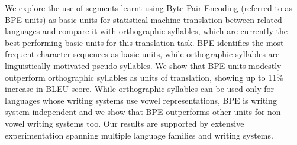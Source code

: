 We explore the use of segments learnt using Byte Pair Encoding (referred to as BPE units) as basic units for statistical machine translation between related languages and compare it with orthographic syllables, which are currently the best performing basic units for this translation task. BPE identifies the most frequent character sequences as basic units, while orthographic syllables are linguistically motivated pseudo-syllables. We show that BPE units modestly outperform orthographic syllables as units of translation, showing up to 11\% increase in BLEU score. While orthographic syllables can be used only for languages whose writing systems use vowel representations, BPE is writing system independent and we show that BPE outperforms other units for non-vowel writing systems too. Our results are supported by extensive experimentation spanning multiple language families and writing systems.
